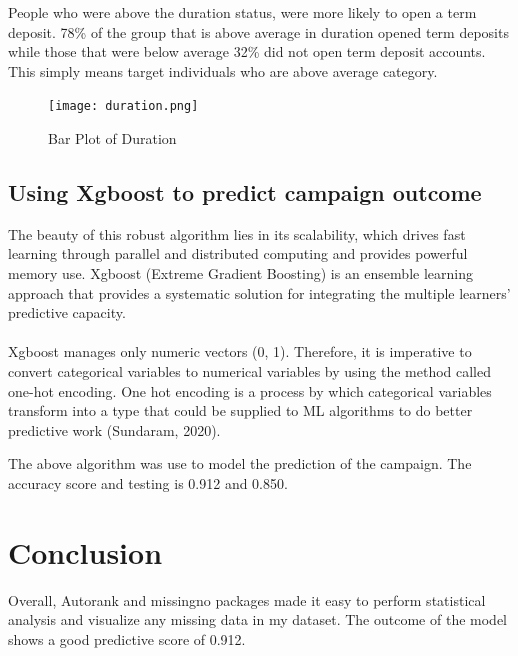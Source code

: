 \documentclass[12pt]{article}
\begin{document}
\newpage
People who were above the duration status, were more likely to open a term deposit. 78\% of the group that is above average in duration opened term deposits while those that were below average 32\% did not open term deposit accounts. This simply means target individuals who are above average category.
\begin{figure}[!htbp]
	\centering
	\texttt{[image: duration.png]}
	\caption{Bar Plot of Duration}
\end{figure}

\newpage
\subsection{Using Xgboost to predict campaign outcome}
The beauty of this robust algorithm lies in its scalability, which drives fast learning
through parallel and distributed computing and provides powerful memory use. Xgboost (Extreme Gradient Boosting) is an ensemble learning approach that provides a systematic solution for integrating the multiple learners' predictive capacity.\\\\
Xgboost manages only numeric vectors (0, 1). Therefore, it is imperative to convert
categorical variables to numerical variables by using the method called one-hot encoding. One hot encoding is a process by which categorical variables transform into a type that could be supplied to ML algorithms to do better predictive work (Sundaram, 2020).

The above algorithm was use to model the prediction of the campaign. The accuracy score and testing is 0.912 and 0.850. 

\section{Conclusion}
Overall, Autorank and missingno packages made it easy to perform statistical analysis and visualize any missing data in my dataset. The outcome of the model shows a good predictive score of 0.912. 
\newpage
\end{document}
